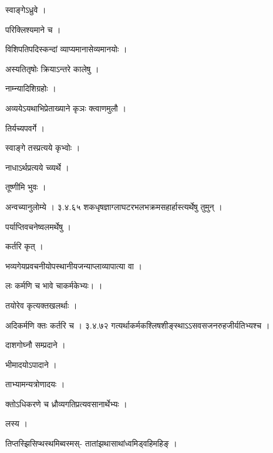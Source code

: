 \documentclass[10pt, openany]{book}
\begin{document}
\noindent स्वाङ्गेऽध्रुवे ।

\noindent परिक्लिश्यमाने च ।

\noindent विशिपतिपदिस्कन्दां व्याप्यमानासेव्यमानयोः ।

\noindent अस्यतितृषोः क्रियाऽन्तरे कालेषु ।

\noindent नाम्न्यादिशिग्रहोः ।

\noindent अव्ययेऽयथाभिप्रेताख्याने कृञः क्त्वाणमुलौ ।

\noindent तिर्यच्यपवर्गे ।

\noindent स्वाङ्गे तस्प्रत्यये कृभ्वोः ।

\noindent नाधाऽर्थप्रत्यये च्व्यर्थे ।

\noindent तूष्णीमि भुवः ।

\noindent अन्वच्यानुलोम्ये । ३.४.६५ शकधृषज्ञाग्लाघटरभलभक्रमसहार्हास्त्यर्थेषु तुमुन् ।

\noindent पर्याप्तिवचनेष्वलमर्थेषु ।

\noindent कर्तरि कृत् ।

\noindent भव्यगेयप्रवचनीयोपस्थानीयजन्याप्लाव्यापात्या वा ।

\noindent लः कर्मणि च भावे चाकर्मकेभ्यः। ।

\noindent तयोरेव कृत्यक्तखलर्थाः ।

\noindent अदिकर्मणि क्तः कर्तरि च । ३.४.७२ गत्यर्थाकर्मकश्लिषशीङ्स्थाऽऽसवसजनरुहजीर्यतिभ्यश्च ।

\noindent दाशगोघ्नौ सम्प्रदाने ।

\noindent भीमादयोऽपादाने ।

\noindent ताभ्यामन्यत्रोणादयः ।

\noindent क्तोऽधिकरणे च ध्रौव्यगतिप्रत्यवसानार्थेभ्यः ।

\noindent लस्य ।

\noindent तिप्तस्झिसिप्थस्थमिब्वस्मस्- तातांझथासाथांध्वमिड्वहिमहिङ् ।
\end{document}

